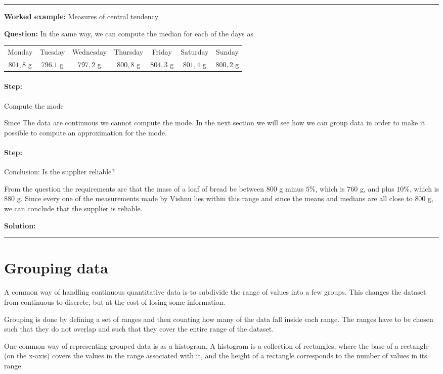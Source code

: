 \documentclass[a4paper,11pt]{report}
\newenvironment{wex}[3]%
{\rule{\linewidth}{0.5mm}
\textbf{Worked example:} #1

\textbf{Question:} #2

\textbf{Solution:} #3}%
{\rule{\linewidth}{0.5mm}}
\newcommand{\westep}[1]{\paragraph{Step:} #1}
\begin{document}
\begin{wex}{Measures of central tendency}
{  In the same way, we can compute the median for each of the days as

  \begin{center}
    \begin{tabular}{ccccccc}
      \toprule
      Monday & Tuesday & Wednesday & Thursday & Friday & Saturday & Sunday \\
      $801,8$ g & $796.1$ g & $797,2$ g & $800,8$ g & $804,3$ g & $801,4$ g & $800,2$ g \\
      \bottomrule
    \end{tabular}
  \end{center}

  \westep{Compute the mode}

  Since The data are continuous we cannot compute the mode. In the next
  section we will see how we can group data in order to make it possible
  to compute an approximation for the mode.

  \westep{Conclusion: Is the supplier reliable?}

  From the question the requirements are that the mass of a loaf of
  bread be between $800$ g minus $5$\%, which is $760$ g, and plus
  $10$\%, which is $880$ g. Since every one of the measurements made
  by Vishnu lies within this range and since the means and medians are
  all close to $800$ g, we can conclude that the supplier is reliable.

}
\end{wex}

\section{Grouping data}
\label{sec:statistics_grouping_data}
A common way of handling continuous quantitative data is to subdivide
the range of values into a few groups. This changes the dataset from
continuous to discrete, but at the cost of losing some information.

Grouping is done by defining a set of ranges and then counting how
many of the data fall inside each range. The ranges have to be chosen
such that they do not overlap and such that they cover the entire
range of the dataset.

One common way of representing grouped data is as a histogram. A
histogram is a collection of rectangles, where the base of a
rectangle (on the x-axis) covers the values in the range associated
with it, and the height of a rectangle corresponds to the number of
values in its range.
\end{document}
